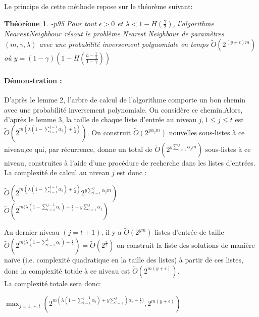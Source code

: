 \documentclass[12pt,openany]{report}
\newtheorem{theorem}{\underline{Théorème}}
\begin{document}
Le principe de cette méthode repose sur le théorème suivant:
\begin{theorem} \cite{Ghazal}-p95 Pour tout $\epsilon > 0 $ et $\lambda < 1-\mathit{H}(\frac{\gamma}{2})$, l'algorithme $ NearestNeighbour $ résout le problème Nearest Neighbour de paramètres $(m,\gamma, \lambda) $ avec une probabilité inversement polynomiale en temps $ \tilde{O}(2^{(y+\epsilon)m})  $ où $ y=(1-\gamma)\left( 1 - H(\frac{h-\frac{\gamma}{2}}{1-\gamma}) \right)  $

\end{theorem}
\paragraph{Démonstration : \\}
D'après le lemme 2, l'arbre de calcul de l'algorithme comporte un bon chemin avec une probabilité inversement polynomiale. On considère ce chemin.Alors, d'après le lemme 3, la taille de chaque liste d'entrée au niveau $   j,1 \leq j \leq  t $ est $ \tilde{O}\left( 2^{m(\lambda(1-\sum_{i=1}^{j-1} \alpha_i )+\frac{\epsilon}{2})} \right) $. On construit $\tilde{O}(2^{y\alpha_j m})  $ nouvelles sous-listes à ce niveau,ce qui, par récurrence, donne un total de $ \tilde{O}\left( 2^{y \sum_{i=1}^{j}\alpha_j m}  \right)  $ sous-listes à ce niveau, construites à l’aide d’une procédure de
recherche dans les listes d’entrées. La complexité de calcul au niveau $j$ est donc :
\begin{center}

$ \tilde{O}\left( 2^{m(\lambda(1-\sum_{i=1}^{j-1} \alpha_i )+\frac{\epsilon}{2})} 2^{y \sum_{i=1}^{j}\alpha_j m}  \right)  $\\

$ \tilde{O}\left( 2^{m(\lambda(1-\sum_{i=1}^{j-1} \alpha_i )+\frac{\epsilon}{2}+ y \sum_{i=1}^{j}\alpha_j } \right) $


\end{center}

Au dernier niveau $(j=t+1)$, il y a $\tilde{O}(2^{ym})  $ listes d'entrée de taille $ \tilde{O}\left( 2^{m(\lambda(1-\sum_{i=1}^{t} \alpha_i )+\frac{\epsilon}{2} } \right)=\tilde{O}(2^{\frac{\epsilon}{2}}) $ on construit la liste des solutions de
manière naïve (i.e. complexité quadratique en la taille des listes) à partir de
ces listes, donc la complexité totale à ce niveau est $ \tilde{O}\left( 2^{m(y+\epsilon)} \right) $.\\
La complexité totale sera donc:
\begin{center}
$\max_{j=1,\cdots,t}\left( 2^{m(\lambda(1-\sum_{i=1}^{j-1}\alpha_i)+ y \sum_{i=1}^{j})\alpha_i +\frac{\epsilon}{2})} ,2^{m(y+\epsilon)} \right)  $
\end{center}
\end{document}
